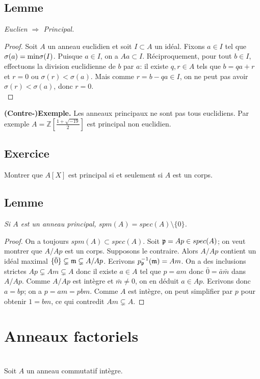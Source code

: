 \documentclass[a4paper, 12pt]{amsart}
\newcommand{\Z}{\mathbb{Z}}
\begin{document}
 

\subsection{Lemme}\label{EuclIsPrinc} \textit{Euclien $\Rightarrow$ Principal.} 
 
 \begin{proof} Soit $A$ un anneau euclidien et soit $I\subset A$ un idéal. Fixons $a\in I$ tel que $\sigma(a)=\hbox{\rm min}\sigma(I)$. Puisque $a\in I$, on a $Aa\subset I$. Réciproquement, pour tout $b\in I$, effectuons la division euclidienne de $b$ par $a$: il existe $q,r\in A$ tels que $b=qa+r$ et $r=0$ ou $\sigma(r)<\sigma(a)$. Mais comme $r=b-qa\in I$, on ne peut pas avoir $\sigma(r)<\sigma(a)$, donc $r=0$.\\
 \end{proof}
 
 \textbf{(Contre-)Exemple.} Les anneaux principaux ne sont pas tous euclidiens. Par exemple  $A=\Z[\frac{1+\sqrt{-19}}{2}]$ est principal non euclidien.\\
 
 \subsection{Exercice} Montrer que $A[X]$ est principal si et seulement si $A$ est un corps. 
  \subsection{Lemme}\textit{Si $A$ est un anneau principal, $spm(A)=spec(A)\setminus \lbrace 0\rbrace$.}
  
  \begin{proof} On a toujours $spm(A)\subset spec(A)$. Soit $\frak{p}=Ap\in spec(A)$; on veut montrer que $A/Ap$ est un corps. Supposons le contraire. Alors $A/Ap$ contient un idéal maximal $\lbrace \bar{0}\rbrace\subsetneq\frak{m}\subsetneq A/Ap$. Ecrivons $p_{\frak{p}}^{-1}(\frak{m})=Am$. On a des inclusions strictes  $Ap\subsetneq Am\subsetneq A$ donc il existe $a\in A$ tel que $p=am$ donc $\bar{0}=\bar{a}\bar{m}$ dans $A/Ap$. Comme $A/Ap$ est intègre et $\bar{m}\not= 0$, on en déduit $a\in Ap$. Ecrivons donc $a=bp$; on a $p=am=pbm$. Comme $A$ est intègre, on peut simplifier par $p$ pour obtenir $1=bm$, ce qui contredit $ Am\subsetneq A$.   \end{proof}
 \section{Anneaux factoriels}\label{Factoriel} \textit{}\\
  Soit $A$ un anneau commutatif intègre. \\
 
\end{document}
